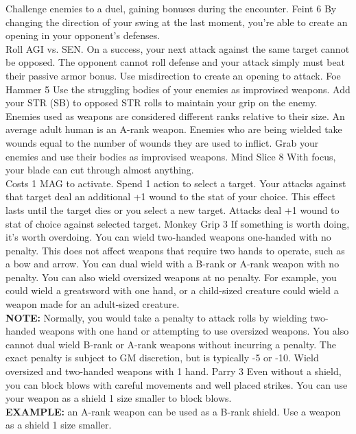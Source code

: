 \begin{path}
{Challenge enemies to a duel, gaining bonuses during the encounter.}
\skilldescription
{Feint}
{6}
{By changing the direction of your swing at the last moment, you're able to create an opening in your opponent's defenses.
\\Roll AGI vs. SEN. On a success, your next attack against the same target cannot be opposed. The opponent cannot roll defense and your attack simply must beat their passive armor bonus.}
{Use misdirection to create an opening to attack.}
\skilldescription
{Foe Hammer}
{5}
{Use the struggling bodies of your enemies as improvised weapons. Add your STR (SB) to opposed STR rolls to maintain your grip on the enemy. Enemies used as weapons are considered different ranks relative to their size. An average adult human is an A-rank weapon. Enemies who are being wielded take wounds equal to the number of wounds they are used to inflict.}
{Grab your enemies and use their bodies as improvised weapons.}
\skilldescription
{Mind Slice}
{8}
{With focus, your blade can cut through almost anything.
\\Costs 1 MAG to activate. Spend 1 action to select a target. Your attacks against that target deal an additional +1 wound to the stat of your choice. This effect lasts until the target dies or you select a new target.}
{Attacks deal +1 wound to stat of choice against selected target.}
\skilldescription
{Monkey Grip}
{3}
{If something is worth doing, it's worth overdoing. You can wield two-handed weapons one-handed with no penalty. This does not affect weapons that require two hands to operate, such as a bow and arrow. You can dual wield with a B-rank or A-rank weapon with no penalty. You can also wield oversized weapons at no penalty. For example, you could wield a greatsword with one hand, or a child-sized creature could wield a weapon made for an adult-sized creature.
\\\textbf{NOTE:} Normally, you would take a penalty to attack rolls by wielding two-handed weapons with one hand or attempting to use oversized weapons. You also cannot dual wield B-rank or A-rank weapons without incurring a penalty. The exact penalty is subject to GM discretion, but is typically -5 or -10.}
{Wield oversized and two-handed weapons with 1 hand.}
\skilldescription
{Parry}
{3}
{Even without a shield, you can block blows with careful movements and well placed strikes. You can use your weapon as a shield 1 size smaller to block blows.
\\\textbf{EXAMPLE:} an A-rank weapon can be used as a B-rank shield.}
{Use a weapon as a shield 1 size smaller.}

\end{path}
